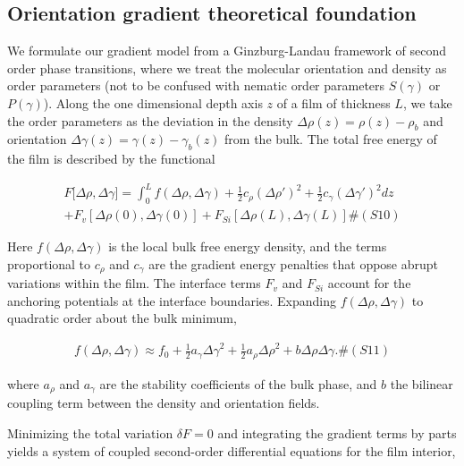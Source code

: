 \subsection{Orientation gradient theoretical foundation}\label{orientation-gradient-theoretical-foundation-1}

We formulate our gradient model from a Ginzburg-Landau framework of second order phase transitions, where we treat the molecular orientation and density as order parameters (not to be confused with nematic order parameters \(S(\gamma)\) or \(P(\gamma)\)).\autocite{gennes2023physics,ginzburg2009theory} Along the one dimensional depth axis \(z\) of a film of thickness \(L\), we take the order parameters as the deviation in the density \(\Delta\rho(z) = \rho(z) - \rho_{b}\) and orientation \(\Delta\gamma(z) = \gamma(z) - \gamma_{b}(z)\) from the bulk. The total free energy of the film is described by the functional

\[\begin{array}{r}
F\lbrack\Delta\rho,\Delta\gamma\rbrack = \int_{0}^{L}{f(\Delta\rho,\Delta\gamma) + \frac{1}{2}c_{\rho}\left( {\Delta\rho}' \right)^{2} + \frac{1}{2}c_{\gamma}\left( {\Delta\gamma}' \right)^{2}dz} \\
 + F_{v}\left\lbrack \Delta\rho(0),\Delta\gamma(0) \right\rbrack + F_{Si}\left\lbrack \Delta\rho(L),\Delta\gamma(L) \right\rbrack\#(S10)
\end{array}\]

Here \(f(\Delta\rho,\Delta\gamma)\) is the local bulk free energy density, and the terms proportional to \(c_{\rho}\) and \(c_{\gamma}\) are the gradient energy penalties that oppose abrupt variations within the film. The interface terms \(F_{v}\) and \(F_{Si}\) account for the anchoring potentials at the interface boundaries. Expanding \(f(\Delta\rho,\Delta\gamma)\) to quadratic order about the bulk minimum,

\[\begin{array}{r}
f(\Delta\rho,\Delta\gamma) \approx f_{0} + \frac{1}{2}a_{\gamma}{\Delta\gamma}^{2} + \frac{1}{2}a_{\rho}{\Delta\rho}^{2} + b\Delta\rho\Delta\gamma.\#(S11)
\end{array}\]

where \(a_{\rho}\) and \(a_{\gamma}\) are the stability coefficients of the bulk phase, and \(b\) the bilinear coupling term between the density and orientation fields.

Minimizing the total variation \(\delta F = 0\) and integrating the gradient terms by parts yields a system of coupled second-order differential equations for the film interior,

